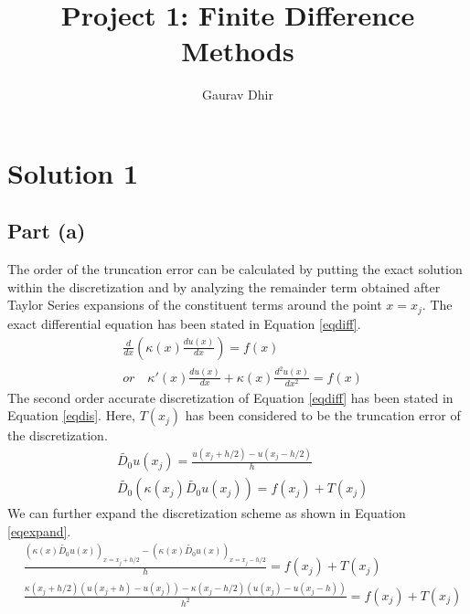 \documentclass[12pt]{article}
\begin{document}
\title{Project 1: Finite Difference Methods}
\author{Gaurav Dhir}
\maketitle
\section{Solution 1}
\subsection{Part (a)}
The order of the truncation error can be calculated by putting the exact solution within the discretization and by analyzing the remainder term obtained after Taylor Series expansions of the constituent terms around the point $x = x_j$. The exact differential equation has been stated in Equation \ref{eqdiff}.
\begin{equation} \label{eqdiff}
    \begin{aligned}
       & \frac{d  }{dx} \left( \kappa(x) \frac{d u(x)}{dx} \right) = f(x)  \\
       & or \quad \kappa'(x)\frac{d u(x)}{dx}+ \kappa(x) \frac{d^2 u(x)}{dx^2} = f(x)
    \end{aligned}
\end{equation}
The second order accurate discretization of Equation \ref{eqdiff} has been stated in Equation \ref{eqdis}. Here, $T(x_j)$ has been considered to be the truncation error of the discretization. 
\begin{equation} \label{eqdis}
    \begin{aligned}
       & \widetilde{D_0}u(x_j) = \frac{u(x_j + h/2) - u(x_j - h/2)}{h} \\
       & \widetilde{D_0}\left(\kappa(x_j)\widetilde{D_0}u(x_j) \right) = f(x_j) + T(x_j)
    \end{aligned}
\end{equation}
We can further expand the discretization scheme as shown in Equation \ref{eqexpand}.
\begin{equation} \label{eqexpand}
    \begin{aligned}
        & \frac{( \kappa(x) \widetilde{D_0} u(x) )_{x = x_j + h/2} - ( \kappa(x) \widetilde{D_0} u(x) )_{x = x_j - h/2}}{h} = f(x_j) + T(x_j) \\
        & \frac{\kappa(x_j + h/2) \left( u(x_j + h) - u(x_j) \right) - \kappa(x_j - h/2) \left( u(x_j) - u(x_j - h) \right)}{h^2} = f(x_j) + T(x_j)    
    \end{aligned}
\end{equation}
\end{document}
